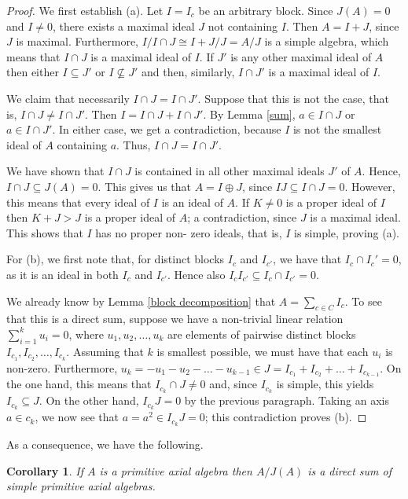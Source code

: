 \documentclass[12pt]{article}
\newtheorem{corollary}[theorem]{Corollary}
\begin{document}
\begin{proof}
We first establish (a). Let $I=I_c$ be an arbitrary block. Since $J(A)=0$ and $I\neq 
0$, there exists a maximal ideal $J$ not containing $I$. Then $A=I+J$, since $J$ is 
maximal. Furthermore, $I/I\cap J\cong I+J/J=A/J$ is a simple algebra, which means 
that $I\cap J$ is a maximal ideal of $I$. If $J'$ is any other maximal ideal of $A$ 
then either $I\subseteq J'$ or $I\not\subseteq J'$ and then, similarly, $I\cap J'$ is 
a maximal ideal of $I$. 

We claim that necessarily $I\cap J=I\cap J'$. Suppose that this is not the case, that 
is, $I\cap J\neq I\cap J'$. Then $I=I\cap J+I\cap J'$. By Lemma \ref{sum}, $a\in 
I\cap J$ or $a\in I\cap J'$. In either case, we get a contradiction, because $I$ is 
not the smallest ideal of $A$ containing $a$. Thus, $I\cap J=I\cap J'$.

We have shown that $I\cap J$ is contained in all other maximal ideals $J'$ of $A$. 
Hence, $I\cap J\subseteq J(A)=0$. This gives us that $A=I\oplus J$, since 
$IJ\subseteq I\cap J=0$. However, this means that every ideal of $I$ is an ideal of 
$A$. If $K\neq 0$ is a proper ideal of $I$ then $K+J>J$ is a proper ideal of $A$; a 
contradiction, since $J$ is a maximal ideal. This shows that $I$ has no proper non-
zero ideals, that is, $I$ is simple, proving (a).

For (b), we first note that, for distinct blocks $I_c$ and $I_{c'}$, we have that 
$I_c\cap I_c'=0$, as it is an ideal in both $I_c$ and $I_{c'}$. Hence also 
$I_cI_{c'}\subseteq I_c\cap I_{c'}=0$.

We already know by Lemma \ref{block decomposition} that $A=\sum_{c\in C}I_c$. To see 
that this is a direct sum, suppose we have a non-trivial linear relation 
$\sum_{i=1}^ku_i=0$, where $u_1,u_2,\ldots,u_k$ are elements of pairwise distinct 
blocks $I_{c_1},I_{c_2},\ldots,I_{c_k}$. Assuming that $k$ is smallest possible, we 
must have that each $u_i$ is non-zero. Furthermore, $u_k=-u_1-u_2-\ldots-u_{k-1}\in 
J=I_{c_1}+I_{c_2}+\ldots+I_{c_{k-1}}$. On the one hand, this means that $I_{c_k}\cap 
J\neq 0$ and, since $I_{c_k}$ is simple, this yields $I_{c_k}\subseteq J$. On the 
other hand, $I_{c_k}J=0$ by the previous paragraph. Taking an axis $a\in c_k$, we now 
see that $a=a^2\in I_{c_k}J=0$; this contradiction proves (b).
\end{proof}

As a consequence, we have the following.

\begin{corollary} \label{modulo Jacobson}
If $A$ is a primitive axial algebra then $A/J(A)$ is a direct sum of simple primitive 
axial algebras.
\end{corollary}
\end{document}
